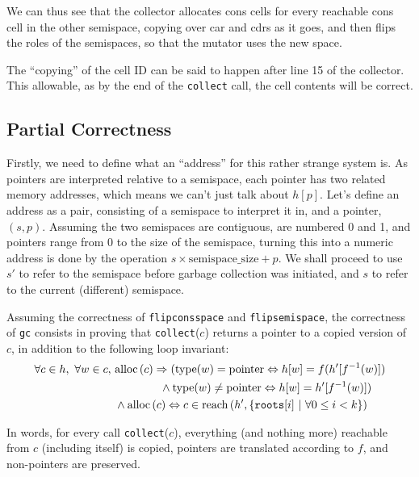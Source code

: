 We can thus see that the collector allocates cons cells for every
reachable cons cell in the other semispace, copying over car and cdrs
as it goes, and then flips the roles of the semispaces, so that the
mutator uses the new space.

The ``copying'' of the cell ID can be said to happen after line 15 of
the collector. This allowable, as by the end of the \texttt{collect}
call, the cell contents will be correct.

\subsection{Partial Correctness}
\label{sec:copying-example-partial}

Firstly, we need to define what an ``address'' for this rather strange
system is. As pointers are interpreted relative to a semispace, each
pointer has two related memory addresses, which means we can't just
talk about $h[p]$. Let's define an address as a pair, consisting of a
semispace to interpret it in, and a pointer, $(s, p)$. Assuming the
two semispaces are contiguous, are numbered 0 and 1, and pointers
range from 0 to the size of the semispace, turning this into a numeric
address is done by the operation $s \times \mathrm{semispace\_size} +
p$. We shall proceed to use $s'$ to refer to the semispace before
garbage collection was initiated, and $s$ to refer to the current
(different) semispace.

Assuming the correctness of \texttt{flipconsspace} and
\texttt{flipsemispace}, the correctness of \texttt{gc} consists in
proving that \texttt{collect}($c$) returns a pointer to a copied
version of $c$, in addition to the following loop invariant:
\begin{align*}
  \forall c \in h,\ \forall w \in c,\ &\mathrm{alloc}\left(c\right) \Rightarrow
  (\mathrm{type}(w) = \mathrm{pointer} \Leftrightarrow h[w] = f(h'[f^{-1}(w)])\\
  &\quad\quad\quad\quad \land \mathrm{type}(w) \neq \mathrm{pointer}
  \Leftrightarrow h[w] = h'[f^{-1}(w)])\\
  &\land \mathrm{alloc}\left(c\right) \Leftrightarrow c \in \mathrm{reach}\left(h', \{\mathtt{roots}[i]~|~\forall
    0 \leq i < k\}\right)
\end{align*}

In words, for every call \texttt{collect}($c$), everything (and
nothing more) reachable from $c$ (including itself) is copied,
pointers are translated according to $f$, and non-pointers are
preserved.

